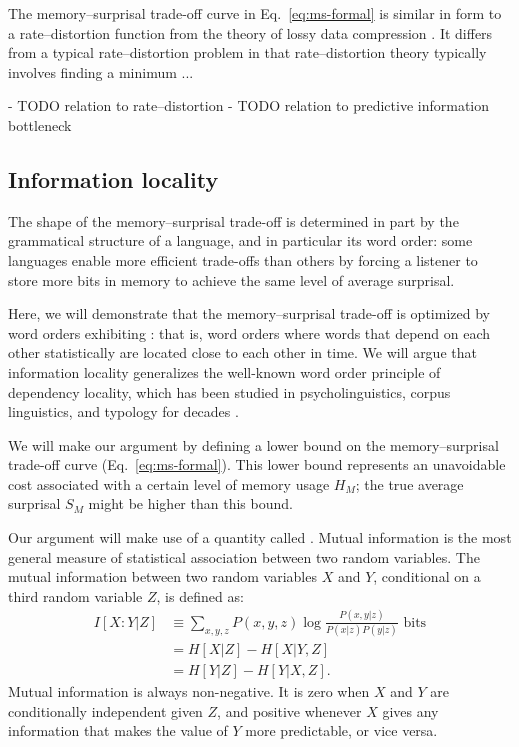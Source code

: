 The memory--surprisal trade-off curve in Eq.~\ref{eq:ms-formal} is similar in form to a rate--distortion function from the theory of lossy data compression \citep[][pp. 301--347]{cover2006elements}. It differs from a typical rate--distortion problem in that rate--distortion theory typically involves finding a minimum ... 

- TODO relation to rate--distortion
- TODO relation to predictive information bottleneck



\subsection{Information locality}

The shape of the memory--surprisal trade-off is determined in part by the grammatical structure of a language, and in particular its word order:
some languages enable more efficient trade-offs than others by forcing a listener to store more bits in memory to achieve the same level of average surprisal.

Here, we will demonstrate that the memory--surprisal trade-off is optimized by word orders exhibiting : that is, word orders where words that depend on each other statistically are located close to each other in time. We will argue that information locality generalizes the well-known word order principle of dependency locality, which has been studied in psycholinguistics, corpus linguistics, and typology for decades \citep{rijkhoff-word-1986,hawkins-performance-1994,gibson-linguistic-1998,liu-dependency-2018,futrell-large-scale-2015,liu-dependency-2017,temperley-minimizing-2018}. 

We will make our argument by defining a lower bound on the memory--surprisal trade-off curve (Eq.~\ref{eq:ms-formal}). This lower bound represents an unavoidable cost associated with a certain level of memory usage $H_M$; the true average surprisal $S_M$ might be higher than this bound. 

Our argument will make use of a quantity called . Mutual information is the most general measure of statistical association between two random variables. The mutual information between two random variables $X$ and $Y$, conditional on a third random variable $Z$, is defined as:
\begin{align}
    I[X:Y|Z] &\equiv \sum_{x,y,z} P(x,y,z) \log \frac{P(x,y|z)}{P(x|z)P(y|z)} \text{ bits} \\
    &= H[X|Z] - H[X|Y,Z] \\
    &= H[Y|Z] - H[Y|X,Z].
\end{align}
Mutual information is always non-negative. It is zero when $X$ and $Y$ are conditionally independent given $Z$, and positive whenever $X$ gives any information that makes the value of $Y$ more predictable, or vice versa. 

